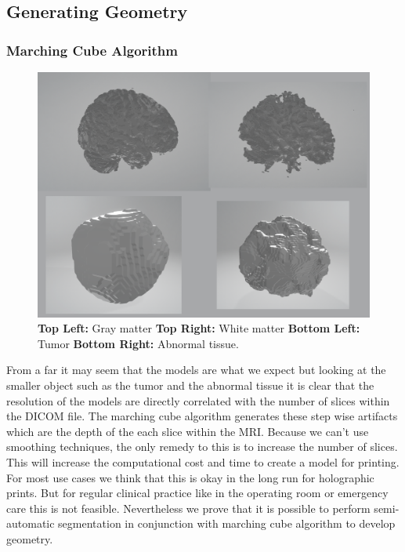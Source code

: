 \subsection{Generating Geometry}

\subsubsection{Marching Cube Algorithm}
\begin{figure}[H]
  \centering
  \includegraphics[width=\linewidth]{img/resultsMarchingCube.PNG}
  \caption{\textbf{Top Left:} Gray matter \textbf{Top Right:} White matter \textbf{Bottom Left:} Tumor \textbf{Bottom Right:} Abnormal tissue.}
  \label{fig:resultsMarchingCube}
\end{figure}

From a far it may seem that the models are what we expect but looking at the smaller object such as the tumor and the abnormal tissue it is clear that the resolution of the models are directly correlated with the number of slices within the DICOM file.  The marching cube algorithm generates these step wise artifacts which are the depth of the each slice within the MRI.  Because we can't use smoothing techniques, the only remedy to this is to increase the number of slices.  This will increase the computational cost and time to create a model for printing.  For most use cases we think that this is okay in the long run for holographic prints.  But for regular clinical practice like in the operating room or emergency care this is not feasible.  Nevertheless we prove that it is possible to perform semi-automatic segmentation in conjunction with marching cube algorithm to develop geometry.\\

